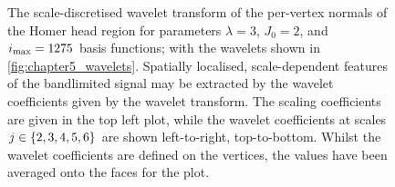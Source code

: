 \begin{figure}[htpb]
    \hfill
    \caption[
        The Slepian wavelet coefficients of a field on Homer's head
    ]{
        The scale-discretised wavelet transform of the per-vertex normals of the Homer head region for parameters \(\lambda=3\), \(J_{0}=2\), and \(i_{\text{max}}=\num{1275}\) basis functions; \ie{} with the wavelets shown in \cref{fig:chapter5_wavelets}.
        Spatially localised, scale-dependent features of the bandlimited signal may be extracted by the wavelet coefficients given by the wavelet transform.
        The scaling coefficients are given in the top left plot, while the wavelet coefficients at scales \(j \in \{2, 3, 4, 5, 6\}\) are shown left-to-right, top-to-bottom.
        Whilst the wavelet coefficients are defined on the vertices, the values have been averaged onto the faces for the plot.
    }\label{fig:chapter5_wavelet_coefficients}
\end{figure}
